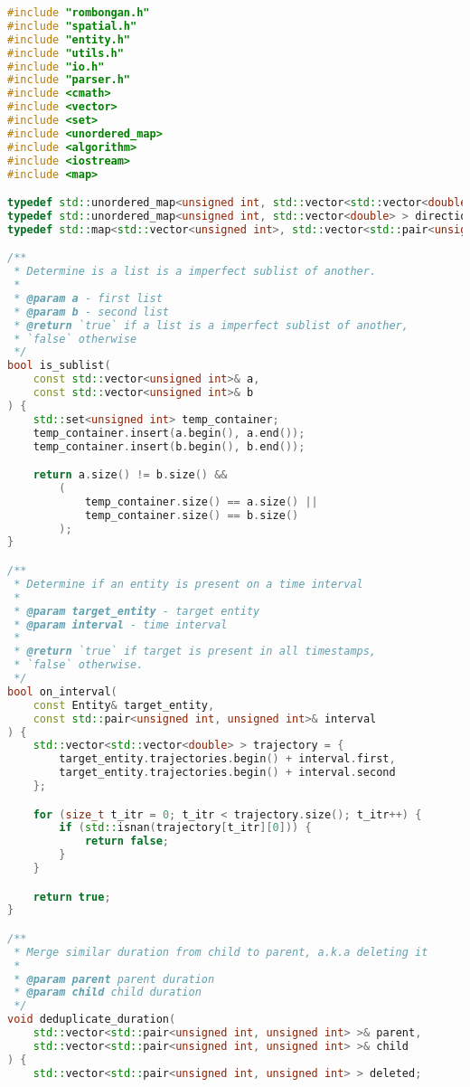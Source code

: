 \begin{lstlisting}[language=C++, caption=Implementasi modul \texttt{rombongan.cpp}, label={lamp:module-rombongan}]
#include "rombongan.h"
#include "spatial.h"
#include "entity.h"
#include "utils.h"
#include "io.h"
#include "parser.h"
#include <cmath>
#include <vector>
#include <set>
#include <unordered_map>
#include <algorithm>
#include <iostream>
#include <map>

typedef std::unordered_map<unsigned int, std::vector<std::vector<double> > > trajectory_map;
typedef std::unordered_map<unsigned int, std::vector<double> > direction_map;
typedef std::map<std::vector<unsigned int>, std::vector<std::pair<unsigned int, unsigned int> > > rombongan_lifespan;

/**
 * Determine is a list is a imperfect sublist of another.
 *
 * @param a - first list
 * @param b - second list
 * @return `true` if a list is a imperfect sublist of another,
 * `false` otherwise
 */
bool is_sublist(
    const std::vector<unsigned int>& a,
    const std::vector<unsigned int>& b
) {
    std::set<unsigned int> temp_container;
    temp_container.insert(a.begin(), a.end());
    temp_container.insert(b.begin(), b.end());

    return a.size() != b.size() &&
        (
            temp_container.size() == a.size() ||
            temp_container.size() == b.size()
        );
}

/**
 * Determine if an entity is present on a time interval
 * 
 * @param target_entity - target entity
 * @param interval - time interval
 * 
 * @return `true` if target is present in all timestamps,
 * `false` otherwise.
 */
bool on_interval(
    const Entity& target_entity,
    const std::pair<unsigned int, unsigned int>& interval
) {
    std::vector<std::vector<double> > trajectory = {
        target_entity.trajectories.begin() + interval.first,
        target_entity.trajectories.begin() + interval.second
    };

    for (size_t t_itr = 0; t_itr < trajectory.size(); t_itr++) {
        if (std::isnan(trajectory[t_itr][0])) {
            return false;
        }
    }

    return true;
}

/**
 * Merge similar duration from child to parent, a.k.a deleting it
 * 
 * @param parent parent duration
 * @param child child duration
 */
void deduplicate_duration(
    std::vector<std::pair<unsigned int, unsigned int> >& parent,
    std::vector<std::pair<unsigned int, unsigned int> >& child
) {
    std::vector<std::pair<unsigned int, unsigned int> > deleted;


\end{lstlisting}
